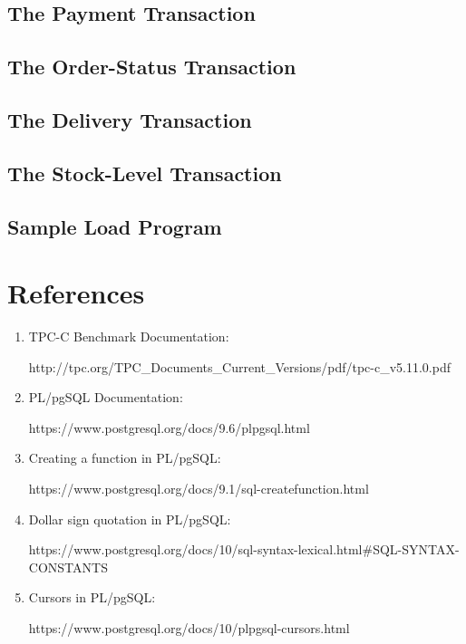 \documentclass[12pt]{article}
\begin{document}
{\subsection{The Payment Transaction}


\subsection{The Order-Status Transaction}


\subsection{The Delivery Transaction}


\subsection{The Stock-Level Transaction}


\subsection{Sample Load Program}



\begin{appendices}

\end{appendices}
}
\newpage
\section*{References}

\begin{enumerate}
    
    \item TPC-C Benchmark Documentation:
    
    http://tpc.org/TPC\_Documents\_Current\_Versions/pdf/tpc-c\_v5.11.0.pdf
    
    \item PL/pgSQL Documentation:
    
    https://www.postgresql.org/docs/9.6/plpgsql.html
    
    \item Creating a function in PL/pgSQL: 
    
    https://www.postgresql.org/docs/9.1/sql-createfunction.html
    
    \item Dollar sign quotation in PL/pgSQL:
    
    https://www.postgresql.org/docs/10/sql-syntax-lexical.html#SQL-SYNTAX-CONSTANTS
    
    \item Cursors in PL/pgSQL: 
    
    https://www.postgresql.org/docs/10/plpgsql-cursors.html
\end{enumerate}
\end{document}
